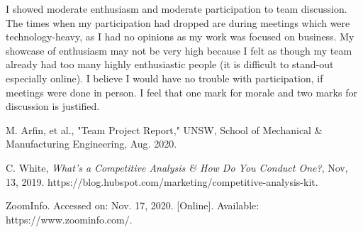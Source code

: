 \documentclass[11pt, a4, nocenter, margin=150mm]{article}
\begin{document}
	I showed moderate enthusiasm and moderate participation to team discussion. The times when my participation had dropped are during meetings which were technology-heavy, as I had no opinions as my work was focused on business. My showcase of enthusiasm may not be very high because I felt as though my team already had too many highly enthusiastic people (it is difficult to stand-out especially online). I believe I would have no trouble with participation, if meetings were done in person. I feel that one mark for morale and two marks for discussion is justified.

\pagebreak

\begin{thebibliography}{3}

	 M. Arfin, et al., "Team Project Report," UNSW, School of Mechanical \& Manufacturing Engineering, Aug. 2020.

	 C. White, \emph{What's a Competitive Analysis \& How Do You Conduct One?}, Nov, 13, 2019. https://blog.hubspot.com/marketing/competitive-analysis-kit.

	 ZoomInfo. Accessed on: Nov. 17, 2020. [Online]. Available: https://www.zoominfo.com/.

\end{thebibliography}

\pagebreak
\end{document}
